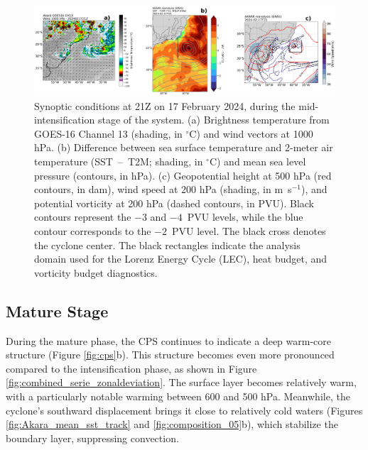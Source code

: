\documentclass[pdflatex,sn-chicago]{sn-jnl}%
\theoremstyle{plain}
\theoremstyle{definition}
\theoremstyle{remark}
\theoremstyle{definition}
\begin{document}
\begin{figure}[h!]
\centering
\includegraphics[width=\textwidth]{composition_04.png}
\caption{Synoptic conditions at 21Z on 17 February 2024, during the mid-intensification stage of the system. (a) Brightness temperature from GOES-16 Channel 13 (shading, in $^{\circ}$C) and wind vectors at 1000 hPa. (b) Difference between sea surface temperature and 2-meter air temperature (SST~--~T2M; shading, in $^{\circ}$C) and mean sea level pressure (contours, in hPa). (c) Geopotential height at 500 hPa (red contours, in dam), wind speed at 200 hPa (shading, in m~s$^{-1}$), and potential vorticity at 200 hPa (dashed contours, in PVU). Black contours represent the $-3$ and $-4$~PVU levels, while the blue contour corresponds to the $-2$~PVU level. The black cross denotes the cyclone center. The black rectangles indicate the analysis domain used for the Lorenz Energy Cycle (LEC), heat budget, and vorticity budget diagnostics.}
\label{fig:composition_04}
\end{figure}


\subsection{Mature Stage}

During the mature phase, the CPS continues to indicate a deep warm-core structure (Figure \ref{fig:cps}b). This structure becomes even more pronounced compared to the intensification phase, as shown in Figure \ref{fig:combined_serie_zonaldeviation}. The surface layer becomes relatively warm, with a particularly notable warming between 600 and 500 hPa. Meanwhile, the cyclone's southward displacement brings it close to relatively cold waters (Figures \ref{fig:Akara_mean_sst_track} and \ref{fig:composition_05}b), which stabilize the boundary layer, suppressing convection.
\end{document}
